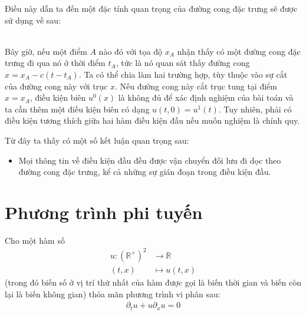 \documentclass[DONG_CHAY_NEN_DUOC.tex]{subfiles}
\begin{document}
Điều này dẫn ta đến một đặc tính quan trọng của đường cong đặc trưng sẽ được sử dụng về sau:\\

\leftskip=1cm
\rightskip=1cm
	\\
	
\leftskip=0pt
\rightskip=0pt

Bây giờ, nếu một điểm $A$ nào đó  với tọa độ $x_A$ nhận thấy có một đường cong đặc trưng đi qua nó ở thời điểm $t_A$, tức là nó quan sát thấy đường cong $x=x_A-c(t-t_A)$. Ta có thể chia làm hai trường hợp, tùy thuộc vào sự cắt của đường cong này với trục $x$. Nếu đường cong này cắt trục tung tại điểm $x=x_A$, điều kiện biên $u^0(x)$ là không đủ để xác định nghiệm của bài toán và ta cần thêm một điều kiện biên có dạng $u(t,0)=u^1(t)$. Tuy nhiên, phải có điều kiện tương thích giữa hai hàm điều kiện đầu nếu muốn nghiệm là chính quy.

Từ đây ta thấy có một số kết luận quan trọng sau:
\begin{itemize}
	\item Mọi thông tin về điều kiện đầu đều được vận chuyển đối lưu đi dọc theo đường cong đặc trưng, kể cả những sự gián đoạn trong điều kiện đầu.
	
\end{itemize}

\section{Phương trình phi tuyến}

Cho một hàm số
\[
\begin{aligned}
	u\colon(\mathbb R^+)^2 &\longrightarrow\mathbb R\\
	(t,x)&\longmapsto u(t,x)		
\end{aligned}
\]
(trong đó biến số ở vị trí thứ nhất của hàm được gọi là biến thời gian và biến còn lại là biến không gian) thỏa mãn phương trình vi phân sau:
\begin{align}
	\partial_tu+u\partial_xu=0
\end{align}
\end{document}
